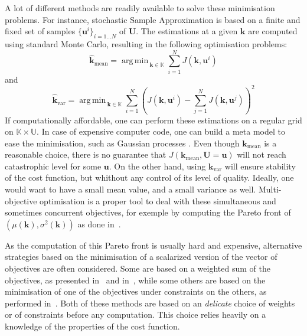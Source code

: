 \documentclass[preprint, 1p]{elsarticle}
\DeclareMathOperator*{\argmin}{arg\,min \,}
\newcommand{\Prob}{\mathbb{P}}
\newcommand{\kmean}{{\mathbf{k}}_{\mathrm{mean}}}
\newcommand{\hatkmean}{\hat{\mathbf{k}}_{\mathrm{mean}}}
\newcommand{\kvar}{{\mathbf{k}}_{\mathrm{var}}}
\newcommand{\hatkvar}{\hat{\mathbf{k}}_{\mathrm{var}}}
\newcommand{\Kspace}{\mathbb{K}}
\newcommand{\Uspace}{\mathbb{U}}
\begin{document}
A lot of different methods are readily available to solve these
minimisation problems. For instance, stochastic Sample Approximation
\citep{juditsky_stochastic_2009,kim_guide_2015} is based on a finite
and fixed set of samples $\{ \mathbf{u}^{i}\}_{i=1 \dots N}$ of
$\mathbf{U}$.
The estimations at a given $\mathbf{k}$ are computed using standard Monte Carlo, resulting in the following optimisation problems:
\begin{equation}
\hatkmean = \argmin_{\mathbf{k} \in \Kspace} \sum_{i=1}^N  J(\mathbf{k},\mathbf{u}^i)
\end{equation}
and
\begin{equation}
\hatkvar = \argmin_{\mathbf{k} \in \Kspace} \sum_{i=1}^N  \left( J(\mathbf{k},\mathbf{u}^i) -  \sum_{j=1}^N  J(\mathbf{k},\mathbf{u}^j) \right )^2
\end{equation}
If computationally affordable, one can perform these estimations on a regular grid on $\Kspace \times \Uspace$. In case of expensive computer code, one can build a meta model to ease the minimisation, such as Gaussian processes \citep{janusevskis_simultaneous_2010}.
Even though $\kmean$ is a reasonable choice, there is no guarantee that $J(\kmean, \mathbf{U}=\mathbf{u})$ will not reach catastrophic level for some  $\mathbf{u}$. On the other hand, using $\kvar$ will ensure stability of the cost function, but whithout any control of its level of quality.
%
%
Ideally, one would want to have a small mean value, and a small variance as well. Multi-objective optimisation is a proper tool to deal with these simultaneous and sometimes concurrent objectives, for exemple by computing the Pareto front of $\left(\mu(\mathbf{k}),\sigma^2(\mathbf{k})\right)$ as done in~\cite{baudoui_optimisation_2012}.

As the computation of this Pareto front is usually hard and expensive, alternative strategies based on the minimisation of a scalarized version of the vector of objectives are often considered. Some are based on a weighted sum of the objectives, as presented in~\cite{grodzevich_normalization_2006} and in~\cite{marler_weighted_2010}, while some others are based on the minimisation of one of the objectives under constraints on the others, as performed in~\cite{lehman_designing_2004}. Both of these methods are based on an \textit{delicate} choice of weights or of constraints before any computation. This choice relies heavily on a knowledge of the properties of the cost function.
\end{document}
